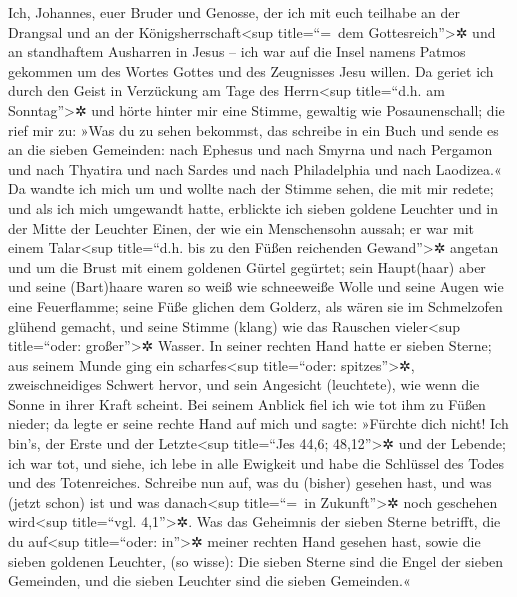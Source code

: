  Ich, Johannes, euer Bruder und Genosse, der ich mit euch
teilhabe an der Drangsal und an der Königsherrschaft\textless sup
title=``=~dem Gottesreich''\textgreater✲ und an standhaftem Ausharren in
Jesus -- ich war auf die Insel namens Patmos gekommen um des Wortes
Gottes und des Zeugnisses Jesu willen.  Da geriet ich
durch den Geist in Verzückung am Tage des Herrn\textless sup
title=``d.h. am Sonntag''\textgreater✲ und hörte hinter mir eine Stimme,
gewaltig wie Posaunenschall;  die rief mir zu: »Was du zu
sehen bekommst, das schreibe in ein Buch und sende es an die sieben
Gemeinden: nach Ephesus und nach Smyrna und nach Pergamon und nach
Thyatira und nach Sardes und nach Philadelphia und nach Laodizea.«
 Da wandte ich mich um und wollte nach der Stimme sehen,
die mit mir redete; und als ich mich umgewandt hatte, erblickte ich
sieben goldene Leuchter  und in der Mitte der Leuchter
Einen, der wie ein Menschensohn aussah; er war mit einem
Talar\textless sup title=``d.h. bis zu den Füßen reichenden
Gewand''\textgreater✲ angetan und um die Brust mit einem goldenen Gürtel
gegürtet;  sein Haupt(haar) aber und seine (Bart)haare
waren so weiß wie schneeweiße Wolle und seine Augen wie eine
Feuerflamme;  seine Füße glichen dem Golderz, als wären
sie im Schmelzofen glühend gemacht, und seine Stimme (klang) wie das
Rauschen vieler\textless sup title=``oder: großer''\textgreater✲ Wasser.
 In seiner rechten Hand hatte er sieben Sterne; aus
seinem Munde ging ein scharfes\textless sup title=``oder:
spitzes''\textgreater✲, zweischneidiges Schwert hervor, und sein
Angesicht (leuchtete), wie wenn die Sonne in ihrer Kraft scheint.
 Bei seinem Anblick fiel ich wie tot ihm zu Füßen nieder;
da legte er seine rechte Hand auf mich und sagte: »Fürchte dich nicht!
Ich bin's, der Erste und der Letzte\textless sup title=``Jes 44,6;
48,12''\textgreater✲  und der Lebende; ich war tot, und
siehe, ich lebe in alle Ewigkeit und habe die Schlüssel des Todes und
des Totenreiches.  Schreibe nun auf, was du (bisher)
gesehen hast, und was (jetzt schon) ist und was danach\textless sup
title=``=~in Zukunft''\textgreater✲ noch geschehen wird\textless sup
title=``vgl. 4,1''\textgreater✲.  Was das Geheimnis der
sieben Sterne betrifft, die du auf\textless sup title=``oder:
in''\textgreater✲ meiner rechten Hand gesehen hast, sowie die sieben
goldenen Leuchter, (so wisse): Die sieben Sterne sind die Engel der
sieben Gemeinden, und die sieben Leuchter sind die sieben Gemeinden.«

